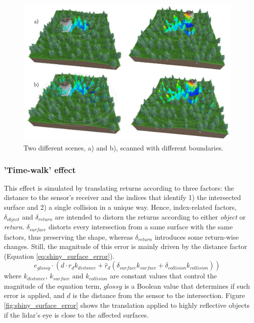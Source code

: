 \begin{figure}[ht]
	\centering
	\includegraphics[width=\linewidth]{figs/lidar_simulation/tls_maximum_range.png}
	\caption{Two different scenes, a) and b), scanned with different boundaries.}
	\label{fig:tls_maximum_range}
\end{figure}

\subsubsection{'Time-walk' effect}

This effect is simulated by translating returns according to three factors: the distance to the sensor's receiver and the indices that identify 1) the intersected surface and 2) a single collision in a unique way. Hence, index-related factors, $\delta_{\textit{object}}$ and $\delta_{\textit{return}}$ are intended to distorn the returns according to either \textit{object} or \textit{return}. $\delta_{\textit{surface}}$ distorts every intersection from a same surface with the same factors, thus preserving the shape, whereas $\delta_{\textit{return}}$ introduces some return-wise changes. Still, the magnitude of this error is mainly driven by the distance factor (Equation \ref{eq:shiny_surface_error}).
\begin{equation}
    \label{eq:shiny_surface_error}
    e_{\textit{glossy}} \cdot (d \cdot \hat{r}_{d} k_{\textit{distance}} + \hat{r}_{d}(\delta_{\textit{surface}}k_{\textit{surface}} + \delta_{\textit{collision}}k_{\textit{collision}})) 
\end{equation}
where $k_{\textit{distance}}$, $k_{\textit{surface}}$ and $k_{\textit{collision}}$ are constant values that control the magnitude of the equation term, $\textit{glossy}$ is a Boolean value that determines if such error is applied, and $d$ is the distance from the sensor to the intersection. Figure \ref{fig:shiny_surface_error} shows the translation applied to highly reflective objects if the \acrshort{lidar}'s eye is close to the affected surfaces.

